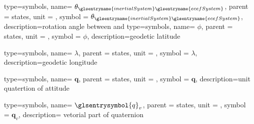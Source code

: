 {type=symbols,
  name= \ensuremath{\theta_{\glsentryname{inertialSystem}\glsentryname{ecefSystem}}},
  parent = {states},
  unit = \unexpanded{\si{\radian\per\second}},
  symbol = \ensuremath{\theta_{\glsentryname{inertialSystem}\glsentryname{ecefSystem}}},
  description={rotation angle between  and }
}
{type=symbols,
  name= \ensuremath{\phi},
  parent = {states},
  unit = \unexpanded{\si{\radian}},
  symbol = \ensuremath{\phi},
  description={geodetic latitude}
}

{type=symbols,
  name= \ensuremath{\lambda},
  parent = {states},
  unit = \unexpanded{\si{\radian}},
  symbol = \ensuremath{\lambda},
  description={geodetic longitude}
}


{type=symbols,
  name= \ensuremath{\mathbf{q}},
  parent = {states},
  unit = \unexpanded{},
  symbol = \ensuremath{\mathbf{q}},
  description={unit quatertion of attitude}
}

{type=symbols,
  name= \ensuremath{\glsentrysymbol{q}_v},
  parent = {states},
  unit = {},
  symbol = \ensuremath{\mathbf{q}_v},
  description={ vetorial part of quaternion }
}

